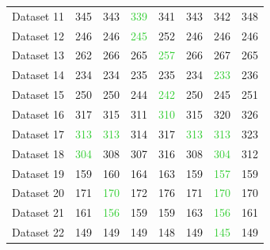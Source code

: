 \documentclass[xcolor=dvipsnames]{beamer}
\begin{document}
\begin{frame}
{\begin{tabular}{*{8}{l}}
 Dataset 11 &\textcolor{ProcessBlue}{345} &  \textcolor{ProcessBlue}{343}  & \textcolor{LimeGreen}{339} &  \textcolor{ProcessBlue}{341}  & \textcolor{ProcessBlue}{343} &  \textcolor{ProcessBlue}{342}  & 348 \\
 Dataset 12 &\textcolor{ProcessBlue}{246}  & \textcolor{ProcessBlue}{246}  & \textcolor{LimeGreen}{245} &  252  & \textcolor{ProcessBlue}{246}  & \textcolor{ProcessBlue}{246}  & 246 \\
 Dataset 13 &\textcolor{ProcessBlue}{262} &  266 &  \textcolor{ProcessBlue}{265}  & \textcolor{LimeGreen}{257}  & 266  & 267 &  265 \\
 Dataset 14 &\textcolor{ProcessBlue}{234}  & \textcolor{ProcessBlue}{234}  & \textcolor{ProcessBlue}{235} &  \textcolor{ProcessBlue}{235}  & \textcolor{ProcessBlue}{234} &  \textcolor{LimeGreen}{233}  & 236 \\
Dataset 15 & \textcolor{ProcessBlue}{250}  & \textcolor{ProcessBlue}{250}  & \textcolor{ProcessBlue}{244}  & \textcolor{LimeGreen}{242}  & \textcolor{ProcessBlue}{250} &  \textcolor{ProcessBlue}{245} &  251 \\
 Dataset 16 & \textcolor{ProcessBlue}{317}  & \textcolor{ProcessBlue}{315}  & \textcolor{ProcessBlue}{311}  & \textcolor{LimeGreen}{310}  & \textcolor{ProcessBlue}{315}  & \textcolor{ProcessBlue}{320}  & 326 \\
 Dataset 17 & \textcolor{LimeGreen}{313}  & \textcolor{LimeGreen}{313} &  \textcolor{ProcessBlue}{314}  & \textcolor{ProcessBlue}{317} &  \textcolor{LimeGreen}{313}  & \textcolor{LimeGreen}{313}  & 323 \\
 Dataset 18 & \textcolor{LimeGreen}{304}  & \textcolor{ProcessBlue}{308} &  \textcolor{ProcessBlue}{307}  & 316 &  \textcolor{ProcessBlue}{308}  & \textcolor{LimeGreen}{304} &  312\\
 Dataset 19 & \textcolor{ProcessBlue}{159} &  160 &  164  & 163  & \textcolor{ProcessBlue}{159} &  \textcolor{LimeGreen}{157}  & 159 \\
 Dataset 20 & 171  & \textcolor{LimeGreen}{170} &  172  & 176  & 171  & \textcolor{LimeGreen}{170}  & 170 \\
 Dataset 21& \textcolor{ProcessBlue}{161}  & \textcolor{LimeGreen}{156}  & \textcolor{ProcessBlue}{159}  & \textcolor{ProcessBlue}{159} &  163  & \textcolor{LimeGreen}{156}  & 161 \\
 Dataset 22& \textcolor{ProcessBlue}{149}  & \textcolor{ProcessBlue}{149} &  \textcolor{ProcessBlue}{149}  & \textcolor{ProcessBlue}{148}  & \textcolor{ProcessBlue}{149}  & \textcolor{LimeGreen}{145} &  149 \\

\end{tabular}}
\end{frame}
\end{document}
